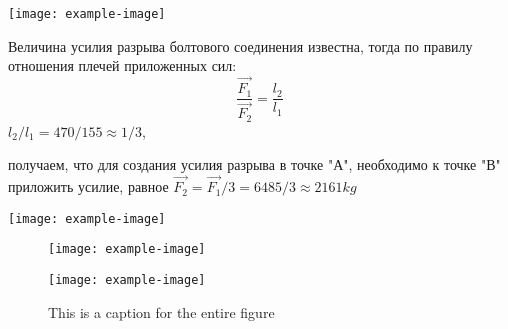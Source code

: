 
\begin{SCfigure}
	\texttt{[image: example-image]}
	\label{ris:images/tormoz}
\end{SCfigure}




\noindent\begin{minipage}{0.4\linewidth}
    {Величина усилия разрыва болтового соединения известна,
        тогда по правилу отношения плечей приложенных сил: 
        \begin{equation}\label{схемаразрыва}
        \frac{\vec{F_1}}{\vec{F_2}} = \frac{l_2}{l_1}  
        \end{equation}
        $ l_2/l_1 = 470/155 \approx 1/3 $, 
        
        получаем, что для создания усилия разрыва в точке "А", необходимо к точке "В" приложить усилие, равное $\vec{ F_2} = \vec{F_1}/3 = 6 485/3 \approx 2 161 kg $
    }
\end{minipage}
\hfill
\begin{minipage}{0.6\linewidth}
    \begin{center}
        \texttt{[image: example-image]}
    \end{center}
\end{minipage}


\begin{figure}[]
	\begin{minipage}{0.49\textwidth}
		\texttt{[image: example-image]}
	\end{minipage}
	\hfill
	\begin{minipage}{0.49\textwidth}
		\texttt{[image: example-image]}
	\end{minipage}
	
	\caption{This is a caption for the entire figure}
	\label{fig:twosubs}
\end{figure}



